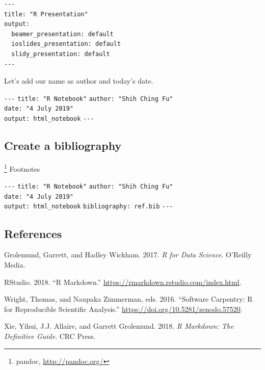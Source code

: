 \documentclass[]{article}
\let\rmarkdownfootnote\footnote%
\def\footnote{\protect\rmarkdownfootnote}
\begin{document}
\begin{verbatim}
---
title: "R Presentation"
output:
  beamer_presentation: default
  ioslides_presentation: default
  slidy_presentation: default
---
\end{verbatim}

Let's add our name as author and today's date.

\texttt{-\/-\/-} \texttt{title:\ "R\ Notebook"}
\texttt{author:\ "Shih\ Ching\ Fu"}\\
\texttt{date:\ "4\ July\ 2019"}~\\
\texttt{output:\ html\_notebook} \texttt{-\/-\/-}

\hypertarget{create-a-bibliography}{%
\subsection{Create a bibliography}\label{create-a-bibliography}}

\footnote{pandoc, \url{http://pandoc.org/}} Footnotes

\texttt{-\/-\/-} \texttt{title:\ "R\ Notebook"}
\texttt{author:\ "Shih\ Ching\ Fu"}\\
\texttt{date:\ "4\ July\ 2019"}~\\
\texttt{output:\ html\_notebook} \texttt{bibliography:\ ref.bib}
\texttt{-\/-\/-}

\hypertarget{references}{%
\subsection*{References}\label{references}}

\hypertarget{refs}{}
\leavevmode\hypertarget{ref-grolemund2017RScience}{}%
Grolemund, Garrett, and Hadley Wickham. 2017. \emph{R for Data Science}.
O'Reilly Media.

\leavevmode\hypertarget{ref-rmarkdown}{}%
RStudio. 2018. ``R Markdown.''
\url{https://rmarkdown.rstudio.com/index.html}.

\leavevmode\hypertarget{ref-wright2016RAnalysis}{}%
Wright, Thomas, and Naupaka Zimmerman, eds. 2016. ``Software Carpentry:
R for Reproducible Scientific Analysis.''
\url{https://doi.org/10.5281/zenodo.57520}.

\leavevmode\hypertarget{ref-xie2018RGuide}{}%
Xie, Yihui, J.J. Allaire, and Garrett Grolemund. 2018. \emph{R Markdown:
The Definitive Guide}. CRC Press.
\end{document}
